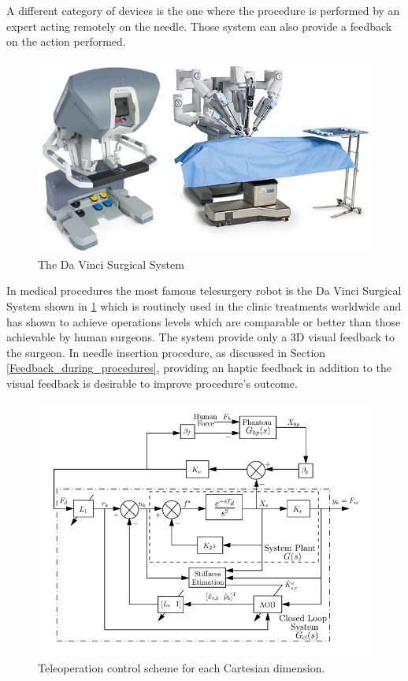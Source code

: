 A different category of devices is the one where the procedure is performed by an expert acting remotely on the needle. Those system can also provide a feedback on the action performed.
\begin{figure}
	\includegraphics[width=\textwidth]{images/da_vinci.jpg}
	\caption[The Da Vinci Surgical System]{The Da Vinci Surgical System \cite{intuitive}}
	\label{fig:da_vinci}
\end{figure}
In medical procedures the most famous telesurgery robot is the Da Vinci Surgical System shown in \figurename{ \ref{fig:da_vinci}} which is routinely used in the clinic treatments worldwide and has shown to achieve operations levels which are comparable or better than those achievable by human surgeons. The system provide only a 3D visual feedback to the surgeon.
In needle insertion procedure, as discussed in Section \ref{Feedback_during_procedures}, providing an haptic feedback in addition to the visual feedback is desirable to improve procedure's outcome.

\begin{figure}
	\includegraphics[width=\textwidth]{images/zarrad_scheme.png}
	\caption[Haptic teleoperation schema (Zarrad)]{Teleoperation control scheme for each Cartesian dimension. \cite{Zarrad2007}}
	\label{fig:zarrad_scheme}
\end{figure}

